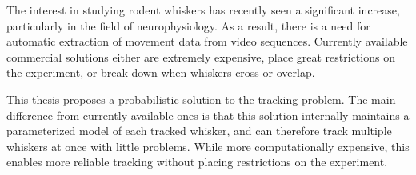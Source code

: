 The interest in studying rodent whiskers has recently seen a significant increase, particularly in the field of neurophysiology. As a result, there is a need for automatic extraction of movement data from video sequences. Currently available commercial solutions either are extremely expensive, place great restrictions on the experiment, or break down when whiskers cross or overlap.

This thesis proposes a probabilistic solution to the tracking problem. The main difference from currently available ones is that this solution internally maintains a parameterized model of each tracked whisker, and can therefore track multiple whiskers at once with little problems. While more computationally expensive, this enables more reliable tracking without placing restrictions on the experiment.
